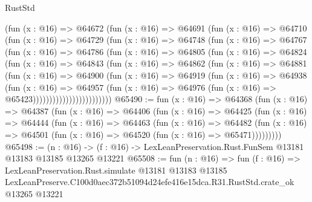 \begin{lexlean}{RustStd}
\begin{coremodule}
                (fun (x : @16) =>
                @64672
                  (fun (x : @16) =>
                  @64691
                    (fun (x : @16) =>
                    @64710
                      (fun (x : @16) =>
                      @64729
                        (fun (x : @16) =>
                        @64748
                          (fun (x : @16) =>
                          @64767
                            (fun (x : @16) =>
                            @64786
                              (fun (x : @16) =>
                              @64805
                                (fun (x : @16) =>
                                @64824
                                  (fun (x : @16) =>
                                  @64843
                                    (fun (x : @16) =>
                                    @64862
                                      (fun (x : @16) =>
                                      @64881
                                        (fun (x : @16) =>
                                        @64900
                                          (fun (x : @16) =>
                                          @64919
                                            (fun (x : @16) =>
                                            @64938
                                              (fun (x : @16) =>
                                              @64957
                                                (fun (x : @16) =>
                                                @64976
                                                  (fun (x : @16) => @65423))))))))))))))))))))))))
@65490 := fun (x : @16) =>
  @64368
    (fun (x : @16) =>
    @64387
      (fun (x : @16) =>
      @64406
        (fun (x : @16) =>
        @64425
          (fun (x : @16) =>
          @64444
            (fun (x : @16) =>
            @64463
              (fun (x : @16) =>
              @64482
                (fun (x : @16) => @64501 (fun (x : @16) => @64520 (fun (x : @16) => @65471)))))))))
@65498 := (n : @16) ->
  (f : @16) -> LexLeanPreservation.Rust.FunSem @13181 @13183 @13185 @13265 @13221
@65508 := fun (n : @16) =>
  fun (f : @16) =>
  LexLeanPreservation.Rust.simulate
    @13181
    @13183
    @13185
    LexLeanPreserve.C100d0aec372b51094d24efe416e15dca.R31.RustStd.crate_ok
    @13265
    @13221
\end{coremodule}
\end{lexlean}
